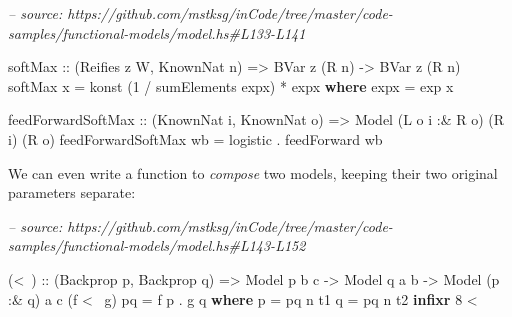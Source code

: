 \documentclass[]{article}
\newenvironment{Shaded}{}{}
\newcommand{\CommentTok}[1]{\textcolor[rgb]{0.38,0.63,0.69}{\textit{#1}}}
\newcommand{\DataTypeTok}[1]{\textcolor[rgb]{0.56,0.13,0.00}{#1}}
\newcommand{\DecValTok}[1]{\textcolor[rgb]{0.25,0.63,0.44}{#1}}
\newcommand{\FunctionTok}[1]{\textcolor[rgb]{0.02,0.16,0.49}{#1}}
\newcommand{\KeywordTok}[1]{\textcolor[rgb]{0.00,0.44,0.13}{\textbf{#1}}}
\newcommand{\NormalTok}[1]{#1}
\newcommand{\OtherTok}[1]{\textcolor[rgb]{0.00,0.44,0.13}{#1}}
\begin{document}
\begin{Shaded}
\begin{Highlighting}[]
\CommentTok{-- source: https://github.com/mstksg/inCode/tree/master/code-samples/functional-models/model.hs#L133-L141}

\OtherTok{softMax ::}\NormalTok{ (}\DataTypeTok{Reifies}\NormalTok{ z }\DataTypeTok{W}\NormalTok{, }\DataTypeTok{KnownNat}\NormalTok{ n) }\OtherTok{=>} \DataTypeTok{BVar}\NormalTok{ z (}\DataTypeTok{R}\NormalTok{ n) }\OtherTok{->} \DataTypeTok{BVar}\NormalTok{ z (}\DataTypeTok{R}\NormalTok{ n)}
\NormalTok{softMax x }\FunctionTok{=}\NormalTok{ konst (}\DecValTok{1} \FunctionTok{/}\NormalTok{ sumElements expx) }\FunctionTok{*}\NormalTok{ expx}
  \KeywordTok{where}
\NormalTok{    expx }\FunctionTok{=}\NormalTok{ exp x}

\NormalTok{feedForwardSoftMax}
\OtherTok{    ::}\NormalTok{ (}\DataTypeTok{KnownNat}\NormalTok{ i, }\DataTypeTok{KnownNat}\NormalTok{ o)}
    \OtherTok{=>} \DataTypeTok{Model}\NormalTok{ (}\DataTypeTok{L}\NormalTok{ o i }\FunctionTok{:&} \DataTypeTok{R}\NormalTok{ o) (}\DataTypeTok{R}\NormalTok{ i) (}\DataTypeTok{R}\NormalTok{ o)}
\NormalTok{feedForwardSoftMax wb }\FunctionTok{=}\NormalTok{ logistic }\FunctionTok{.}\NormalTok{ feedForward wb}
\end{Highlighting}
\end{Shaded}

We can even write a function to \emph{compose} two models, keeping their two
original parameters separate:

\begin{Shaded}
\begin{Highlighting}[]
\CommentTok{-- source: https://github.com/mstksg/inCode/tree/master/code-samples/functional-models/model.hs#L143-L152}

\NormalTok{(}\FunctionTok{<~}\NormalTok{)}
\OtherTok{    ::}\NormalTok{ (}\DataTypeTok{Backprop}\NormalTok{ p, }\DataTypeTok{Backprop}\NormalTok{ q)}
    \OtherTok{=>} \DataTypeTok{Model}\NormalTok{  p       b c}
    \OtherTok{->} \DataTypeTok{Model}\NormalTok{       q  a b}
    \OtherTok{->} \DataTypeTok{Model}\NormalTok{ (p }\FunctionTok{:&}\NormalTok{ q) a c}
\NormalTok{(f }\FunctionTok{<~}\NormalTok{ g) pq }\FunctionTok{=}\NormalTok{ f p }\FunctionTok{.}\NormalTok{ g q}
  \KeywordTok{where}
\NormalTok{    p }\FunctionTok{=}\NormalTok{ pq }\FunctionTok{^^.}\NormalTok{ t1}
\NormalTok{    q }\FunctionTok{=}\NormalTok{ pq }\FunctionTok{^^.}\NormalTok{ t2}
\KeywordTok{infixr} \DecValTok{8} \FunctionTok{<~}
\end{Highlighting}
\end{Shaded}
\end{document}
